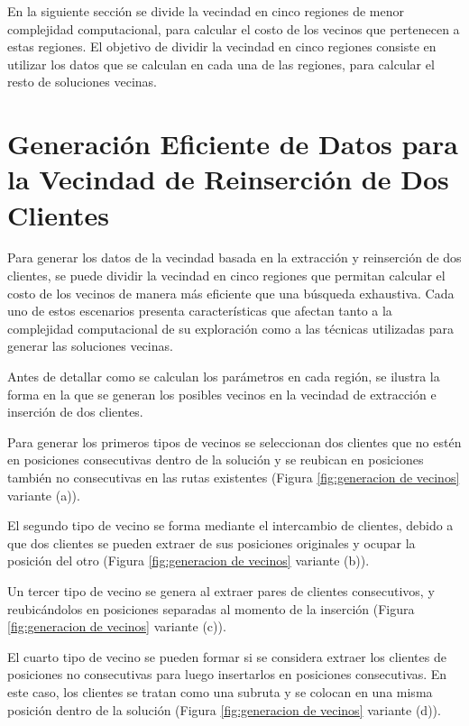\documentclass[12pt]{report}
\begin{document}
	En la siguiente sección se divide la vecindad en cinco regiones de menor complejidad computacional, para calcular el costo de los vecinos que pertenecen a estas regiones. El objetivo de dividir la vecindad en cinco regiones consiste en utilizar los datos que se calculan en cada una de las regiones, para calcular el resto de soluciones vecinas.

	\section{Generación Eficiente de Datos para la Vecindad de Reinserción de Dos Clientes}
	\label{sec:Generacion Eficiente}

	Para generar los datos de la vecindad basada en la extracción y reinserción de dos clientes, se puede dividir la vecindad en cinco regiones que permitan calcular el costo de los vecinos de manera más eficiente que una búsqueda exhaustiva. Cada uno de estos escenarios presenta características que afectan tanto a la complejidad computacional de su exploración como a las técnicas utilizadas para generar las soluciones vecinas.

	Antes de detallar como se calculan los parámetros en cada región, se ilustra  la forma en la que se generan los posibles vecinos en la vecindad de extracción e inserción de dos clientes.

	Para generar los primeros tipos de vecinos se seleccionan dos clientes que no estén en posiciones consecutivas dentro de la solución y se reubican en posiciones también no consecutivas en las rutas existentes (Figura \ref{fig:generacion de vecinos} variante (a)).

	El segundo tipo de vecino se forma mediante el intercambio de clientes, debido a que dos clientes se pueden extraer de sus posiciones originales y ocupar la posición del otro (Figura \ref{fig:generacion de vecinos} variante (b)).

	Un tercer tipo de vecino se genera al extraer pares de clientes consecutivos, y reubicándolos en posiciones separadas al momento de la inserción (Figura \ref{fig:generacion de vecinos} variante (c)).

	El cuarto tipo de vecino se pueden formar si se considera extraer los clientes de posiciones no consecutivas para luego insertarlos en posiciones consecutivas. En este caso, los clientes se tratan como una subruta y se colocan en una misma posición dentro de la solución (Figura \ref{fig:generacion de vecinos} variante (d)).
\end{document}
